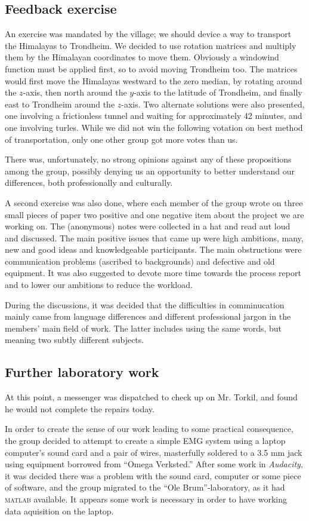 \documentclass[a4paper, oneside, fleqn, halfparskip]{scrartcl}
\begin{document}
\subsection{Feedback exercise}
An exercise was mandated by the village; we should device a way to transport the Himalayas to Trondheim. We decided to use rotation matrices and multiply them by the Himalayan coordinates to move them. Obviously a windowind function must be applied first, so to avoid moving Trondheim too. The matrices would first move the Himalayas westward to the zero median, by rotating around the $z$-axis, then north around the $y$-axis to the latitude of Trondheim, and finally east to Trondheim around the $z$-axis. Two alternate solutions were also presented, one involving a frictionless tunnel and waiting for approximately 42 minutes, and one involving turles. While we did not win the following votation on best method of transportation, only one other group got more votes than us.

There was, unfortunately, no strong opinions against any of these propositions among the group, possibly denying us an opportunity to better understand our differences, both professionally and culturally.

A second exercise was also done, where each member of the group wrote on three small pieces of paper two positive and one negative item about the project we are working on. The (anonymous) notes were collected in a hat and read aut loud and discussed. The main positive issues that came up were high ambitions, many, new and good ideas and knowledgeable participants. The main obstructions were communication problems (ascribed to backgrounds) and defective and old equipment. It was also suggested to devote more time towards the process report and to lower our ambitions to reduce the workload.

During the discussions, it was decided that the difficulties in comminucation mainly came from language differences and different professional jargon in the members' main field of work. The latter includes using the same words, but meaning two subtly different subjects.

\subsection{Further laboratory work}
At this point, a messenger was dispatched to check up on Mr. Torkil, and found he would not complete the repairs today. 

In order to create the sense of our work leading to some practical consequence, the group decided to attempt to create a simple EMG system using a laptop computer's sound card and a pair of wires, masterfully soldered to a 3.5 mm jack using equipment borrowed from ``Omega Verksted.'' After some work in \textit{Audacity}, it was decided there was a problem with the sound card, computer or some piece of software, and the group migrated to the ``Ole Brum''-laboratory, as it had \textsc{matlab} available. It appears some work is necessary in order to have working data aquisition on the laptop.
\end{document}
